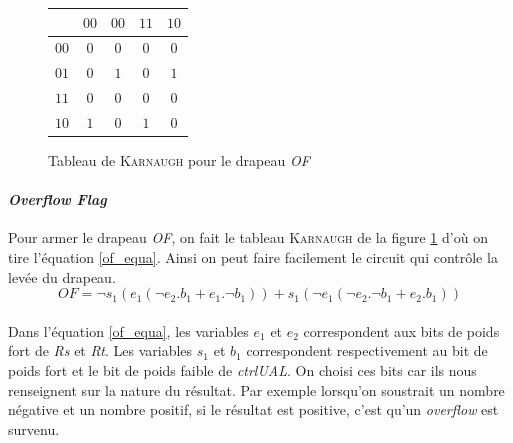 \begin{figure}
	\centering
	\begin{tabular}{|c|c|c|c|c|}
	\hline \backslashbox{$s_{1}e_{1}$}{$e_ {2}b_{1}$} & $00$ & $00$ & $11$ & $10$ \\ 
	\hline $00$ & $0$ & $0$ & $0$ & $0$ \\ 
	\hline $01$ & $0$ & $1$ & $0$ & $1$ \\ 
	\hline $11$ & $0$ & $0$ & $0$ & $0$ \\ 
	\hline $10$ & $1$ & $0$ & $1$ & $0$ \\ 
	\hline 
	\end{tabular}
	\caption{
		\label{of_karnaugh}
		Tableau de \textsc{Karnaugh} pour le drapeau \textit{OF}
	}
\end{figure}

\paragraph{\textit{Overflow Flag}}{
	Pour armer le drapeau \textit{OF}, on fait le tableau \textsc{Karnaugh}
	de la figure \ref{of_karnaugh} d'où on tire l'équation \ref{of_equa}.
	Ainsi on peut faire facilement le circuit qui contrôle la levée du drapeau. 
}
	\begin{equation}
		\label{of_equa}
		{OF} = \neg s_{1} ( e_{1} ( \neg e_{2} . b_{1} + e_{1} . \neg b_{1} ) ) 
			+ s_{1} ( \neg e_{1} ( \neg e_{2} . \neg b_{1} + e_{2} . b_{1} ))
	\end{equation}

\paragraph{}{
	Dans l'équation \ref{of_equa}, les variables  $e_{1}$ et $e_{2}$ correspondent aux bits de poids fort de \textit{Rs}
	et \textit{Rt}. Les variables $s_{1}$ et $b_{1}$ correspondent respectivement au bit
	de poids fort et le bit de poids faible de \textit{ctrlUAL}. On choisi ces bits car
	ils nous renseignent sur la nature du résultat. Par exemple lorsqu'on soustrait un 
	nombre négative et un nombre positif, si le résultat est positive, c'est qu'un 
	\textit{overflow} est survenu.
	
}